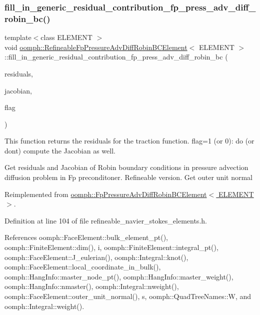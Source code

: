 \subsubsection{\texorpdfstring{fill\+\_\+in\+\_\+generic\+\_\+residual\+\_\+contribution\+\_\+fp\+\_\+press\+\_\+adv\+\_\+diff\+\_\+robin\+\_\+bc()}{fill\_in\_generic\_residual\_contribution\_fp\_press\_adv\_diff\_robin\_bc()}}
{\footnotesize\ttfamily template$<$class E\+L\+E\+M\+E\+NT $>$ \\
void \hyperlink{classoomph_1_1RefineableFpPressureAdvDiffRobinBCElement}{oomph\+::\+Refineable\+Fp\+Pressure\+Adv\+Diff\+Robin\+B\+C\+Element}$<$ E\+L\+E\+M\+E\+NT $>$\+::fill\+\_\+in\+\_\+generic\+\_\+residual\+\_\+contribution\+\_\+fp\+\_\+press\+\_\+adv\+\_\+diff\+\_\+robin\+\_\+bc (\begin{DoxyParamCaption}\item[{\hyperlink{classoomph_1_1Vector}{Vector}$<$ double $>$ \&}]{residuals,  }\item[{\hyperlink{classoomph_1_1DenseMatrix}{Dense\+Matrix}$<$ double $>$ \&}]{jacobian,  }\item[{unsigned}]{flag }\end{DoxyParamCaption})\hspace{0.3cm}{\ttfamily [virtual]}}



This function returns the residuals for the traction function. flag=1 (or 0)\+: do (or don\textquotesingle{}t) compute the Jacobian as well. 

Get residuals and Jacobian of Robin boundary conditions in pressure advection diffusion problem in Fp preconditoner. Refineable version. Get outer unit normal 

Reimplemented from \hyperlink{classoomph_1_1FpPressureAdvDiffRobinBCElement_a6a902a30a8b1c2d4105a7c0639a81f58}{oomph\+::\+Fp\+Pressure\+Adv\+Diff\+Robin\+B\+C\+Element$<$ E\+L\+E\+M\+E\+N\+T $>$}.



Definition at line 104 of file refineable\+\_\+navier\+\_\+stokes\+\_\+elements.\+h.



References oomph\+::\+Face\+Element\+::bulk\+\_\+element\+\_\+pt(), oomph\+::\+Finite\+Element\+::dim(), i, oomph\+::\+Finite\+Element\+::integral\+\_\+pt(), oomph\+::\+Face\+Element\+::\+J\+\_\+eulerian(), oomph\+::\+Integral\+::knot(), oomph\+::\+Face\+Element\+::local\+\_\+coordinate\+\_\+in\+\_\+bulk(), oomph\+::\+Hang\+Info\+::master\+\_\+node\+\_\+pt(), oomph\+::\+Hang\+Info\+::master\+\_\+weight(), oomph\+::\+Hang\+Info\+::nmaster(), oomph\+::\+Integral\+::nweight(), oomph\+::\+Face\+Element\+::outer\+\_\+unit\+\_\+normal(), s, oomph\+::\+Quad\+Tree\+Names\+::W, and oomph\+::\+Integral\+::weight().



